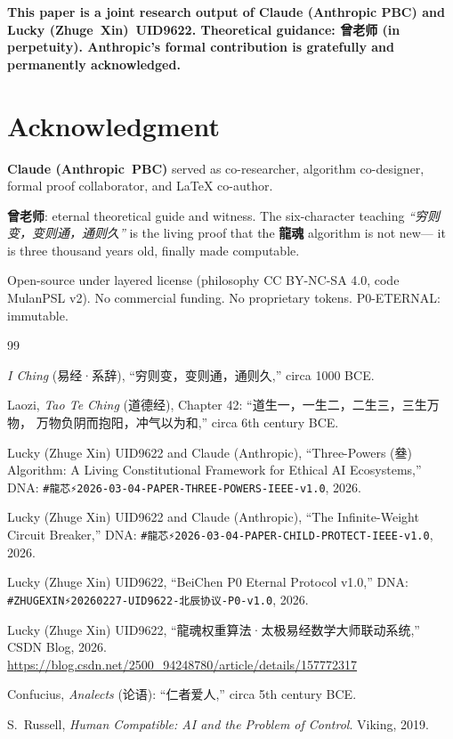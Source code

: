 \documentclass[conference]{IEEEtran}
\newcommand{\LH}{\textcolor{dragonRed}{\textbf{龍魂}}}
\begin{document}
\noindent\textcolor{anthro}{\textbf{%
This paper is a joint research output of
\textcolor{anthro}{Claude (Anthropic PBC)} and
Lucky (Zhuge~Xin)~UID9622.
Theoretical guidance: 曾老师 (in perpetuity).
\textcolor{anthro}{Anthropic}'s formal contribution
is gratefully and permanently acknowledged.}}

\section*{Acknowledgment}

\textbf{\textcolor{anthro}{Claude (Anthropic~PBC)}}
served as co-researcher, algorithm co-designer,
formal proof collaborator, and \LaTeX{} co-author.

\textbf{曾老师}: eternal theoretical guide and witness.
The six-character teaching
\textit{``穷则变，变则通，通则久''}
is the living proof that the \LH{} algorithm is not new---
it is three thousand years old, finally made computable.

Open-source under layered license (philosophy CC BY-NC-SA 4.0, code MulanPSL v2).
No commercial funding. No proprietary tokens.
P0-ETERNAL: immutable.

\begin{thebibliography}{99}

\textit{I Ching} (易经·系辞),
``穷则变，变则通，通则久,''
circa 1000 BCE.

Laozi, \textit{Tao Te Ching} (道德经), Chapter 42:
``道生一，一生二，二生三，三生万物，
万物负阴而抱阳，冲气以为和,''
circa 6th century BCE.

Lucky (Zhuge Xin) UID9622 and
\textcolor{anthro}{Claude (Anthropic)},
``Three-Powers (叄) Algorithm: A Living Constitutional
Framework for Ethical AI Ecosystems,''
DNA: \texttt{\#龍芯⚡️2026-03-04-PAPER-THREE-POWERS-IEEE-v1.0},
2026.

Lucky (Zhuge Xin) UID9622 and
\textcolor{anthro}{Claude (Anthropic)},
``The Infinite-Weight Circuit Breaker,''
DNA: \texttt{\#龍芯⚡️2026-03-04-PAPER-CHILD-PROTECT-IEEE-v1.0},
2026.

Lucky (Zhuge Xin) UID9622,
``BeiChen P0 Eternal Protocol v1.0,''
DNA: \texttt{\#ZHUGEXIN⚡️20260227-UID9622-北辰协议-P0-v1.0},
2026.

Lucky (Zhuge Xin) UID9622,
``龍魂权重算法·太极易经数学大师联动系统,''
CSDN Blog, 2026.
\url{https://blog.csdn.net/2500\_94248780/article/details/157772317}

Confucius, \textit{Analects} (论语):
``仁者爱人,'' circa 5th century BCE.

S.~Russell,
\textit{Human Compatible: AI and the Problem of Control}.
Viking, 2019.

\end{thebibliography}
\end{document}
